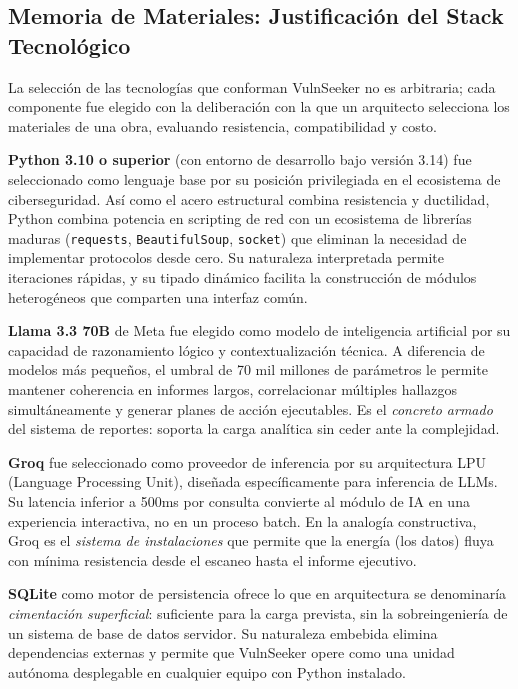 \documentclass[12pt, a4paper]{article}
\begin{document}
\subsection{Memoria de Materiales: Justificación del Stack Tecnológico}

La selección de las tecnologías que conforman VulnSeeker no es arbitraria;
cada componente fue elegido con la deliberación con la que un arquitecto
selecciona los materiales de una obra, evaluando resistencia, compatibilidad
y costo.

\textbf{Python 3.10 o superior} (con entorno de desarrollo bajo versión 3.14) fue seleccionado como lenguaje base por su posición
privilegiada en el ecosistema de ciberseguridad. Así como el acero estructural
combina resistencia y ductilidad, Python combina potencia en scripting de red
con un ecosistema de librerías maduras (\texttt{requests}, \texttt{BeautifulSoup},
\texttt{socket}) que eliminan la necesidad de implementar protocolos desde cero.
Su naturaleza interpretada permite iteraciones rápidas, y su tipado dinámico
facilita la construcción de módulos heterogéneos que comparten una interfaz
común.

\textbf{Llama 3.3 70B} de Meta fue elegido como modelo de inteligencia
artificial por su capacidad de razonamiento lógico y contextualización
técnica. A diferencia de modelos más pequeños, el umbral de 70 mil millones
de parámetros le permite mantener coherencia en informes largos, correlacionar
múltiples hallazgos simultáneamente y generar planes de acción ejecutables. Es
el \textit{concreto armado} del sistema de reportes: soporta la carga
analítica sin ceder ante la complejidad.

\textbf{Groq} fue seleccionado como proveedor de inferencia por su
arquitectura LPU (Language Processing Unit), diseñada específicamente para
inferencia de LLMs. Su latencia inferior a 500ms por consulta convierte al
módulo de IA en una experiencia interactiva, no en un proceso batch. En la
analogía constructiva, Groq es el \textit{sistema de instalaciones} que
permite que la energía (los datos) fluya con mínima resistencia desde el
escaneo hasta el informe ejecutivo.

\textbf{SQLite} como motor de persistencia ofrece lo que en arquitectura se
denominaría \textit{cimentación superficial}: suficiente para la carga
prevista, sin la sobreingeniería de un sistema de base de datos servidor. Su
naturaleza embebida elimina dependencias externas y permite que VulnSeeker
opere como una unidad autónoma desplegable en cualquier equipo con Python
instalado.
\end{document}

